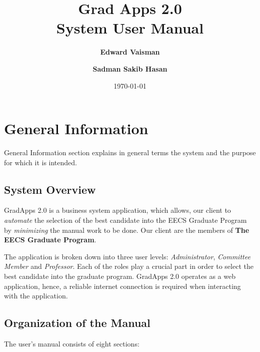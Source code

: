 \documentclass[fontsize=12pt,paper=letter,twoside]{scrartcl}
\author{\textbf{Edward Vaisman}
\and \textbf{Sadman Sakib Hasan}
}
\date{\today} %
\begin{document}
\title{Grad Apps 2.0 \\ System User Manual}
\maketitle

\newpage

\tableofcontents

\newpage



\section{General Information}
General Information section explains in general terms the system and the purpose for which it is
intended.

\subsection{System Overview}

GradApps 2.0 is a business system application, which allows, our client to \emph{automate} the selection of the best candidate into the EECS Graduate Program by \emph{minimizing} the manual work to be done. Our client are the members of \textbf{The EECS Graduate Program}.

\bigskip
\noindent The application is broken down into three user levels: \emph{Administrator}, \emph{Committee Member} and \emph{Professor}. Each of the roles play a crucial part in order to select the best candidate into the graduate program. GradApps 2.0 operates as a web application, hence, a reliable internet connection is required when interacting with the application.

\subsection{Organization of the Manual}
The user’s manual consists of eight sections:
\end{document}
